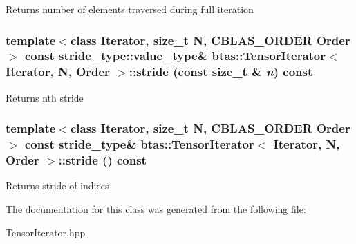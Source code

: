 \label{classbtas_1_1_tensor_iterator_adddb70a169a79dbf3ca20b2aaa9d7bbc}
\begin{DoxyReturn}{Returns}
number of elements traversed during full iteration 
\end{DoxyReturn}
\hypertarget{classbtas_1_1_tensor_iterator_ab9869c6e8504e968f4fd2e170f26bd25}{
\subsubsection[{stride}]{\setlength{\rightskip}{0pt plus 5cm}template$<$class Iterator, size\_\-t N, CBLAS\_\-ORDER Order$>$ const stride\_\-type::value\_\-type\& {\bf btas::TensorIterator}$<$ Iterator, N, Order $>$::stride (const size\_\-t \& {\em n}) const}}
\label{classbtas_1_1_tensor_iterator_ab9869c6e8504e968f4fd2e170f26bd25}
\begin{DoxyReturn}{Returns}
nth stride 
\end{DoxyReturn}
\hypertarget{classbtas_1_1_tensor_iterator_a9bc81d9b128b82094c4bcad7a7a608a5}{
\subsubsection[{stride}]{\setlength{\rightskip}{0pt plus 5cm}template$<$class Iterator, size\_\-t N, CBLAS\_\-ORDER Order$>$ const stride\_\-type\& {\bf btas::TensorIterator}$<$ Iterator, N, Order $>$::stride () const}}
\label{classbtas_1_1_tensor_iterator_a9bc81d9b128b82094c4bcad7a7a608a5}
\begin{DoxyReturn}{Returns}
stride of indices 
\end{DoxyReturn}


The documentation for this class was generated from the following file:\begin{DoxyCompactItemize}
\item 
TensorIterator.hpp\end{DoxyCompactItemize}
